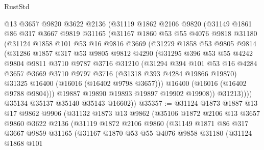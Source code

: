 \begin{lexlean}{RustStd}
\begin{coremodule}
        @13
        @3657
        @9820
        @3622
        @2136
        (@31119
          @1862
          @2106
          @9820
          (@31149
            @1861
            @86
            @317
            @3667
            @9819
            @31165
            (@31167
              @1860
              @53
              @55
              @4076
              @9818
              @31180
              (@31124
                @1858
                @101
                @53
                @16
                @9816
                @3669
                (@31279
                  @1858
                  @53
                  @9805
                  @9814
                  (@31286
                    @1857
                    @317
                    @53
                    @9805
                    @9812
                    @4290
                    (@31295
                      @396
                      @53
                      @55
                      @4242
                      @9804
                      @9811
                      @3710
                      @9787
                      @3716
                      @31210
                      (@31294
                        @394
                        @101
                        @53
                        @16
                        @4284
                        @3657
                        @3669
                        @3710
                        @9797
                        @3716
                        (@31318 @393 @4284 @19866 @19870)
                        @31325
                        @16400
                        (@16016 (@16402 @9798 @3657)))
                      @16400
                      (@16016 (@16402 @9788 @9804)))
                    @19887
                    @19890
                    @19893
                    @19897
                    @19902
                    @19908))
                @31213))))
        @35134
        @35137
        @35140
        @35143
        @16602))
@35357 := @31124
    @1873
    @1887
    @13
    @17
    @9862
    @9906
    (@31132
      @1873
      @13
      @9862
      (@35106
        @1872
        @2106
        @13
        @3657
        @9860
        @3622
        @2136
        (@31119
          @1872
          @2106
          @9860
          (@31149
            @1871
            @86
            @317
            @3667
            @9859
            @31165
            (@31167
              @1870
              @53
              @55
              @4076
              @9858
              @31180
              (@31124
                @1868
                @101

\end{coremodule}
\end{lexlean}
